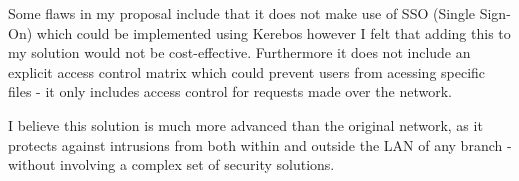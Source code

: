 \documentclass[11pt]{article}
\begin{document}
      Some flaws in my proposal include that it does not make use of SSO (Single Sign-On) which could be implemented using Kerebos however I felt that adding this to my solution would not be cost-effective. Furthermore it does not include an explicit access control matrix which could prevent users from acessing specific files - it only includes access control for requests made over the network.

      I believe this solution is much more advanced than the original network, as it protects against intrusions from both within and outside the LAN of any branch - without involving a complex set of security solutions.

  \newpage

  
  
\end{document}
